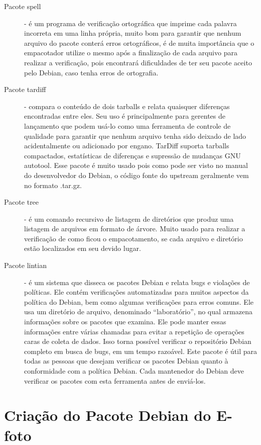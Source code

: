 \begin{description}
	\item[Pacote spell] - é um programa de verificação ortográfica que imprime cada palavra incorreta em uma linha própria, muito bom para garantir que nenhum arquivo do pacote conterá erros ortográficos, é de muita importância que o empacotador utilize o mesmo após a finalização de cada arquivo para realizar a verificação, pois encontrará dificuldades de ter seu pacote aceito pelo Debian, caso tenha erros de ortografia.
	\item[Pacote tardiff] - compara o conteúdo de dois tarballs %
	 e relata quaisquer diferenças encontradas entre eles. Seu uso é principalmente para gerentes de lançamento que podem usá-lo como uma ferramenta de controle de qualidade para garantir que nenhum arquivo tenha sido deixado de lado acidentalmente ou adicionado por engano. TarDiff suporta tarballs compactados, estatísticas de diferenças e supressão de mudanças GNU autotool. Esse pacote é muito usado pois como pode ser visto no manual do desenvolvedor do Debian, o código fonte do upstream geralmente vem no formato .tar.gz.
	\item[Pacote tree] - é um comando recursivo de listagem de diretórios que produz uma listagem de arquivos em formato de árvore. Muito usado para realizar a verificação de como ficou o empacotamento, se cada arquivo e diretório estão localizados em seu devido lugar.
	\item[Pacote lintian] - é um sistema que disseca os pacotes Debian e relata bugs e violações de políticas. Ele contém verificações automatizadas para muitos aspectos da política do Debian, bem como algumas verificações para erros comuns. Ele usa um diretório de arquivo, denominado “laboratório”, no qual armazena informações sobre os pacotes que examina. Ele pode manter essas informações entre várias chamadas para evitar a repetição de operações caras de coleta de dados. Isso torna possível verificar o repositório Debian completo em busca de bugs, em um tempo razoável. Este pacote é útil para todas as pessoas que desejam verificar os pacotes Debian quanto à conformidade com a política Debian. Cada mantenedor do Debian deve verificar os pacotes com esta ferramenta antes de enviá-los.
\end{description}
 
\section{Criação do Pacote Debian do E-foto}

